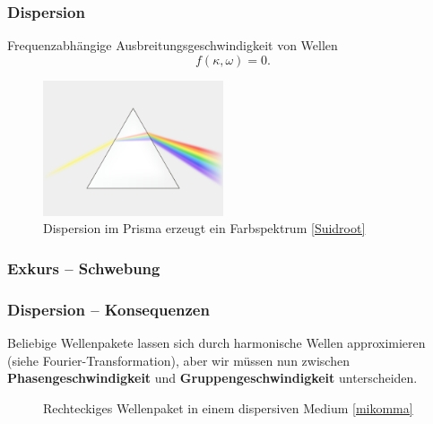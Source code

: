 \begin{frame}
\frametitle{Dispersion}
Frequenzabhängige Ausbreitungsgeschwindigkeit von Wellen 
\begin{equation*}
  f(\kappa,\omega)=0.
\end{equation*}
\begin{figure}
\includegraphics[width=0.475\textwidth]{fig_img/wikipedia_dispersion.png}
\caption*{Dispersion im Prisma erzeugt ein Farbspektrum \href{https://commons.wikimedia.org/w/index.php?curid=3728535}{[Suidroot]}}
\end{figure}
\end{frame}


\begin{frame}
\frametitle{Exkurs -- Schwebung}


\end{frame}


\begin{frame}
\frametitle{Dispersion -- Konsequenzen}
  Beliebige Wellenpakete lassen sich durch harmonische Wellen approximieren (siehe Fourier-Transformation), aber wir müssen nun zwischen \textbf{Phasengeschwindigkeit} und \textbf{Gruppengeschwindigkeit} unterscheiden.

\vspace{-7cm}  
\begin{figure}
\hspace{5cm}

\vspace{3cm}

\caption*{Rechteckiges Wellenpaket in einem dispersiven Medium \href{http://www.mikomma.de/optik/disp/dispimp.htm}{[mikomma]}}
\end{figure}
\end{frame}


